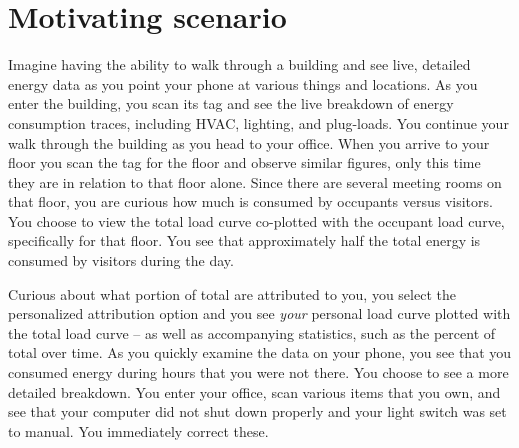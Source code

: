\section{Motivating scenario}
\label{sec:vision}


Imagine having the ability to walk through a building and see live, detailed energy data as
you point your phone at various things and locations.  As you enter the building, you scan its tag and see
the live breakdown of energy consumption traces, including HVAC, lighting, and plug-loads.  You continue
your walk through the building as you head to your office.  When you arrive to your floor
you scan the tag for the floor and observe similar figures, only this time they are in relation to that floor
alone.  Since there are several meeting rooms on that floor, you are curious how much is consumed by 
occupants versus visitors.  You choose to view the total load curve co-plotted with the occupant
load curve, specifically for that floor.  You see that approximately half the total energy is consumed
by visitors during the day.  

Curious about what portion of total are attributed to you, you select the 
personalized attribution option and you see \emph{your} personal load curve plotted
with the total load curve -- as well as accompanying statistics, such as the percent of total over time.
As you quickly examine the data on your phone, you see that you consumed energy during hours that you were not
there.  You choose to see a more detailed breakdown.  You enter your office, scan various items that you own, and see that
your computer did not shut down properly and your light switch was set to manual.  You immediately 
correct these.

